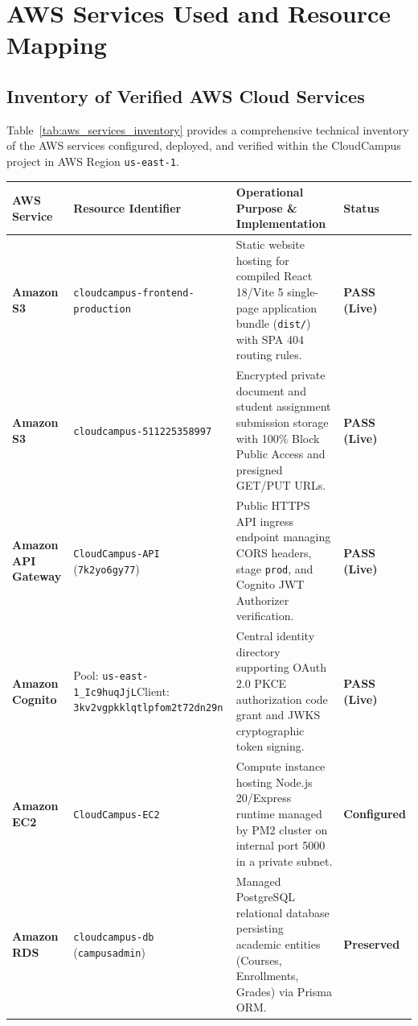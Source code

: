 \newpage
\section{AWS Services Used and Resource Mapping}

\subsection{Inventory of Verified AWS Cloud Services}
Table~\ref{tab:aws_services_inventory} provides a comprehensive technical inventory of the AWS services configured, deployed, and verified within the CloudCampus project in AWS Region \texttt{us-east-1}.

\begin{table}[H]
\centering
\small
\renewcommand{\arraystretch}{1.2}
\begin{tabularx}{\textwidth}{l p{3.2cm} X l}
\toprule
\textbf{\color{primaryblue}AWS Service} & \textbf{\color{primaryblue}Resource Identifier} & \textbf{\color{primaryblue}Operational Purpose \& Implementation} & \textbf{\color{primaryblue}Status} \\
\midrule
\textbf{Amazon S3} & \texttt{cloudcampus-frontend-production} & Static website hosting for compiled React 18/Vite 5 single-page application bundle (\texttt{dist/}) with SPA 404 routing rules. & \textbf{PASS (Live)} \\
\addlinespace
\textbf{Amazon S3} & \texttt{cloudcampus-511225358997} & Encrypted private document and student assignment submission storage with 100\% Block Public Access and presigned GET/PUT URLs. & \textbf{PASS (Live)} \\
\addlinespace
\textbf{Amazon API Gateway} & \texttt{CloudCampus-API} (\texttt{7k2yo6gy77}) & Public HTTPS API ingress endpoint managing CORS headers, stage \texttt{prod}, and Cognito JWT Authorizer verification. & \textbf{PASS (Live)} \\
\addlinespace
\textbf{Amazon Cognito} & Pool: \texttt{us-east-1\_Ic9huqJjL}\newline Client: \texttt{3kv2vgpkklqtlpfom2t72dn29n} & Central identity directory supporting OAuth 2.0 PKCE authorization code grant and JWKS cryptographic token signing. & \textbf{PASS (Live)} \\
\addlinespace
\textbf{Amazon EC2} & \texttt{CloudCampus-EC2} & Compute instance hosting Node.js 20/Express runtime managed by PM2 cluster on internal port 5000 in a private subnet. & \textbf{Configured} \\
\addlinespace
\textbf{Amazon RDS} & \texttt{cloudcampus-db} (\texttt{campusadmin}) & Managed PostgreSQL relational database persisting academic entities (Courses, Enrollments, Grades) via Prisma ORM. & \textbf{Preserved} \\

\end{tabularx}
\end{table}
